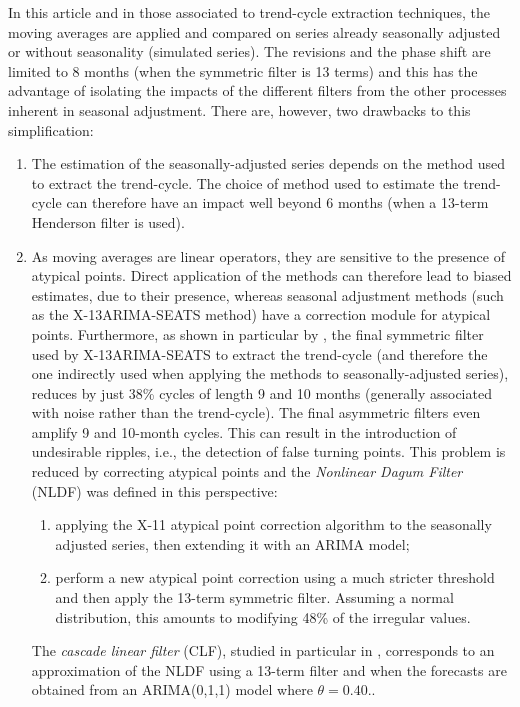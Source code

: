 \documentclass[
]{article}
\newcommand\1{\mathds{1}}
\begin{document}
In this article and in those associated to trend-cycle extraction
techniques, the moving averages are applied and compared on series
already seasonally adjusted or without seasonality (simulated series).
The revisions and the phase shift are limited to 8 months (when the
symmetric filter is 13 terms) and this has the advantage of isolating
the impacts of the different filters from the other processes inherent
in seasonal adjustment. There are, however, two drawbacks to this
simplification:

\begin{enumerate}
\def\labelenumi{\arabic{enumi}.}
\item
  The estimation of the seasonally-adjusted series depends on the method
  used to extract the trend-cycle. The choice of method used to estimate
  the trend-cycle can therefore have an impact well beyond 6 months
  (when a 13-term Henderson filter is used).
\item
  As moving averages are linear operators, they are sensitive to the
  presence of atypical points. Direct application of the methods can
  therefore lead to biased estimates, due to their presence, whereas
  seasonal adjustment methods (such as the X-13ARIMA-SEATS method) have
  a correction module for atypical points. Furthermore, as shown in
  particular by \textcite{dagum1996new}, the final symmetric filter used
  by X-13ARIMA-SEATS to extract the trend-cycle (and therefore the one
  indirectly used when applying the methods to seasonally-adjusted
  series), reduces by just 38\% cycles of length 9 and 10 months
  (generally associated with noise rather than the trend-cycle). The
  final asymmetric filters even amplify 9 and 10-month cycles. This can
  result in the introduction of undesirable ripples, i.e., the detection
  of false turning points. This problem is reduced by correcting
  atypical points and the \emph{Nonlinear Dagum Filter} (NLDF) was
  defined in this perspective:

  \begin{enumerate}
  \def\labelenumii{\alph{enumii}.}
  \item
    applying the X-11 atypical point correction algorithm \autocite[see
    for example][ for a description]{ladiray2011seasonal} to the
    seasonally adjusted series, then extending it with an ARIMA model;
  \item
    perform a new atypical point correction using a much stricter
    threshold and then apply the 13-term symmetric filter. Assuming a
    normal distribution, this amounts to modifying 48\% of the irregular
    values.
  \end{enumerate}

  The \emph{cascade linear filter} (CLF), studied in particular in
  \textcite{dagumBianconcini2023}, corresponds to an approximation of
  the NLDF using a 13-term filter and when the forecasts are obtained
  from an ARIMA(0,1,1) model where \(\theta=0.40.\).
\end{enumerate}
\end{document}
